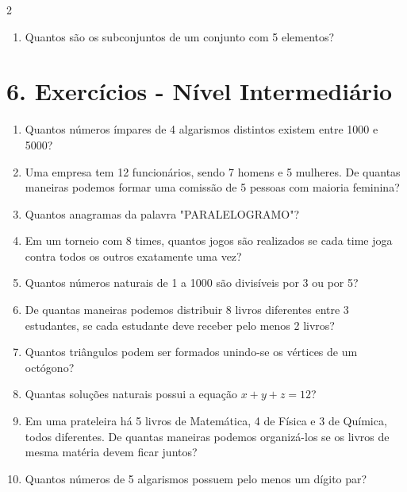 \documentclass[11pt]{article}
\begin{document}
\begin{multicols}{2}
\begin{enumerate}[leftmargin=*]
\item Quantos são os subconjuntos de um conjunto com 5 elementos?
\end{enumerate}

\section*{6. Exercícios - Nível Intermediário}

\begin{enumerate}[leftmargin=*, start=11]
\item Quantos números ímpares de 4 algarismos distintos existem entre 1000 e 5000?

\item Uma empresa tem 12 funcionários, sendo 7 homens e 5 mulheres. De quantas maneiras podemos formar uma comissão de 5 pessoas com maioria feminina?

\item Quantos anagramas da palavra "PARALELOGRAMO"?

\item Em um torneio com 8 times, quantos jogos são realizados se cada time joga contra todos os outros exatamente uma vez?

\item Quantos números naturais de 1 a 1000 são divisíveis por 3 ou por 5?

\item De quantas maneiras podemos distribuir 8 livros diferentes entre 3 estudantes, se cada estudante deve receber pelo menos 2 livros?

\item Quantos triângulos podem ser formados unindo-se os vértices de um octógono?

\item Quantas soluções naturais possui a equação $x + y + z = 12$?

\item Em uma prateleira há 5 livros de Matemática, 4 de Física e 3 de Química, todos diferentes. De quantas maneiras podemos organizá-los se os livros de mesma matéria devem ficar juntos?

\item Quantos números de 5 algarismos possuem pelo menos um dígito par?
\end{enumerate}



\end{multicols}
\end{document}
